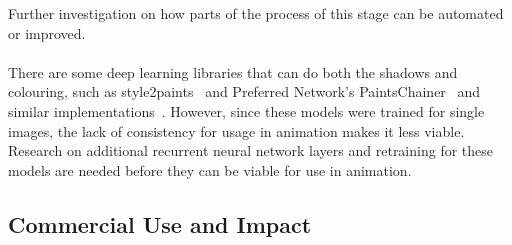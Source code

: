 Further investigation on how parts of the process of this stage can be automated or improved.\\\\

There are some deep learning libraries that can do both the shadows and colouring, such as style2paints~\cite{style2paintsArxiv} and Preferred Network's PaintsChainer~\cite{paintsChainer} and similar implementations~\cite{autoPainter}. However, since these models were trained for single images, the lack of consistency for usage in animation makes it less viable. Research on additional recurrent neural network layers and retraining for these models are needed before they can be viable for use in animation.

\subsection{Commercial Use and Impact}

